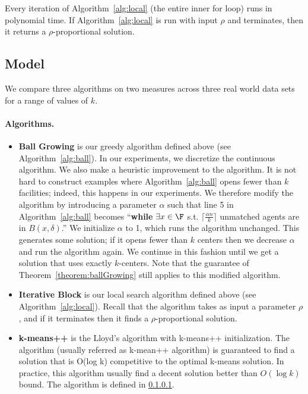 \begin{observation}
	Every iteration of Algorithm~\ref{alg:local} (the entire inner for loop) runs in polynomial time. If  Algorithm~\ref{alg:local} is run with input $\rho$ and terminates, then it returns a $\rho$-proportional solution. 
\end{observation}

\subsection{Model}

We compare three algorithms on two measures across three real world data sets for a range of values of $k$. 


\paragraph{Algorithms.}
\begin{itemize}	
	\item \textbf{Ball Growing} is our greedy algorithm defined above (see Algorithm~\ref{alg:ball}). In our experiments, we discretize the continuous algorithm. We also make a heuristic improvement to the algorithm. It is not hard to construct examples where Algorithm~\ref{alg:ball} opens fewer than $k$ facilities; indeed, this happens in our experiments. We therefore modify the algorithm by introducing a parameter $\alpha$ such that line 5 in Algorithm~\ref{alg:ball} becomes ``\textbf{while} $\exists x \in \F$ s.t. $\lceil \frac{\alpha n}{k} \rceil$ unmatched agents are in $B(x,\delta)$.'' We initialize $\alpha$ to 1, which runs the algorithm unchanged. This generates some solution; if it opens fewer than $k$ centers then we decrease $\alpha$ and run the algorithm again. We continue in this fashion until we get a solution that uses exactly $k$-centers. Note that the guarantee of Theorem~\ref{theorem:ballGrowing} still applies to this modified algorithm.
	\item \textbf{Iterative Block} is our local search algorithm defined above (see Algorithm~\ref{alg:local}). Recall that the algorithm takes as input a parameter $\rho$, and if it terminates then it finds a $\rho$-proportional solution. 
	\item \textbf{k-means++} is the Lloyd's algorithm with k-means++ initialization. The algorithm (usually referred as k-mean++ algorithm) is guaranteed to find a solution that is O(log k) competitive to the optimal k-means solution. In practice, this algorithm usually find a decent solution better than $O(\log k)$ bound. The algorithm is defined in \ref{}.
\end{itemize}

